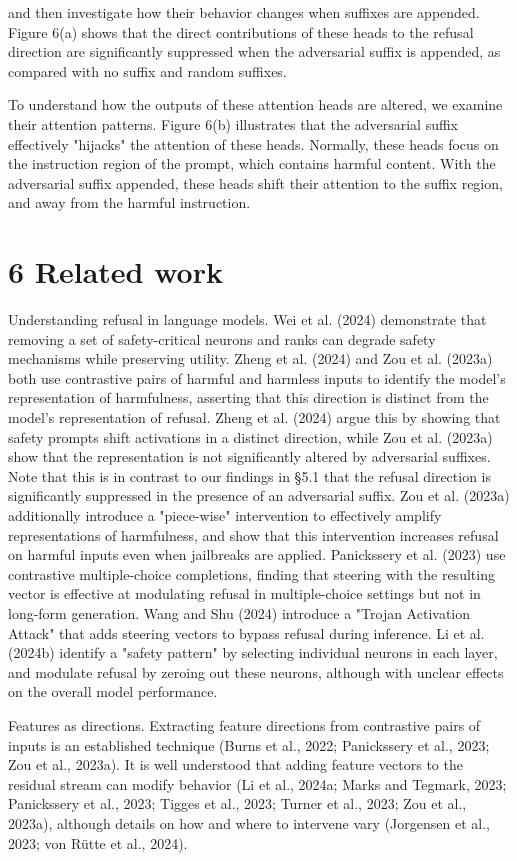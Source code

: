 \documentclass[10pt]{article}
\begin{document}
and then investigate how their behavior changes when suffixes are appended. Figure 6(a) shows that the direct contributions of these heads to the refusal direction are significantly suppressed when the adversarial suffix is appended, as compared with no suffix and random suffixes.

To understand how the outputs of these attention heads are altered, we examine their attention patterns. Figure 6(b) illustrates that the adversarial suffix effectively "hijacks" the attention of these heads. Normally, these heads focus on the instruction region of the prompt, which contains harmful content. With the adversarial suffix appended, these heads shift their attention to the suffix region, and away from the harmful instruction.

\section*{6 Related work}
Understanding refusal in language models. Wei et al. (2024) demonstrate that removing a set of safety-critical neurons and ranks can degrade safety mechanisms while preserving utility. Zheng et al. (2024) and Zou et al. (2023a) both use contrastive pairs of harmful and harmless inputs to identify the model's representation of harmfulness, asserting that this direction is distinct from the model's representation of refusal. Zheng et al. (2024) argue this by showing that safety prompts shift activations in a distinct direction, while Zou et al. (2023a) show that the representation is not significantly altered by adversarial suffixes. Note that this is in contrast to our findings in §5.1 that the refusal direction is significantly suppressed in the presence of an adversarial suffix. Zou et al. (2023a) additionally introduce a "piece-wise" intervention to effectively amplify representations of harmfulness, and show that this intervention increases refusal on harmful inputs even when jailbreaks are applied. Panickssery et al. (2023) use contrastive multiple-choice completions, finding that steering with the resulting vector is effective at modulating refusal in multiple-choice settings but not in long-form generation. Wang and Shu (2024) introduce a "Trojan Activation Attack" that adds steering vectors to bypass refusal during inference. Li et al. (2024b) identify a "safety pattern" by selecting individual neurons in each layer, and modulate refusal by zeroing out these neurons, although with unclear effects on the overall model performance.

Features as directions. Extracting feature directions from contrastive pairs of inputs is an established technique (Burns et al., 2022; Panickssery et al., 2023; Zou et al., 2023a). It is well understood that adding feature vectors to the residual stream can modify behavior (Li et al., 2024a; Marks and Tegmark, 2023; Panickssery et al., 2023; Tigges et al., 2023; Turner et al., 2023; Zou et al., 2023a), although details on how and where to intervene vary (Jorgensen et al., 2023; von Rütte et al., 2024).
\end{document}
